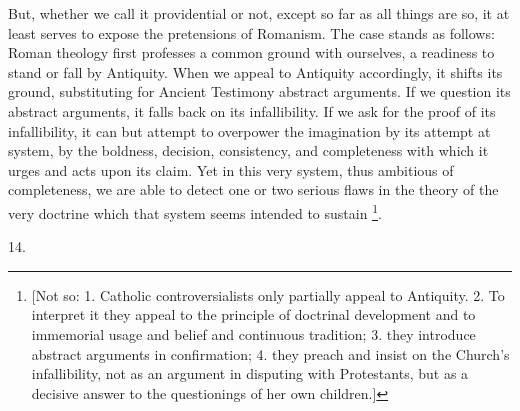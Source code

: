 But, whether we call it providential or not, except so far as all
things are so, it at least serves to expose the pretensions of
Romanism. The case stands as follows: Roman theology first professes a
common ground with ourselves, a readiness to stand or fall by
Antiquity. When we appeal to Antiquity accordingly, it shifts its
ground, substituting for Ancient Testimony abstract arguments. If we
question its abstract arguments, it falls back on its infallibility.
If we ask for the proof of its infallibility, it can but attempt to
overpower the imagination by its attempt at system, by the boldness,
decision, consistency, and completeness with which it urges and acts
upon its claim. Yet in this very system, thus ambitious of
completeness, we are able to detect one or two serious flaws in the
theory of the very doctrine which that system seems intended to
sustain \footnote{[Not so: 1. Catholic controversialists
only partially appeal to Antiquity. 2. To interpret it they appeal to
the principle of doctrinal development and to immemorial usage and
belief and continuous tradition; 3. they introduce abstract arguments
in confirmation; 4. they preach and insist on the Church's
infallibility, not as an argument in disputing with Protestants, but
as a decisive answer to the questionings of her own children.]}.

14.

